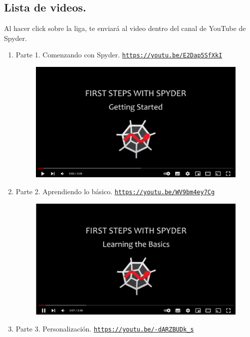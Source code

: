 \subsection{Lista de videos.}

Al hacer click sobre la liga, te enviará al video dentro del canal de YouTube de Spyder.

\begin{enumerate}
\item Parte 1. Comenzando con Spyder. \href{https://youtu.be/E2Dap5SfXkI}{\texttt{https://youtu.be/E2Dap5SfXkI}}
\begin{figure}[H]
    \centering
    \includegraphics[scale=0.4]{Imagenes/Guia_IDE_12.png}
\end{figure}
\item Parte 2. Aprendiendo lo básico. \href{https://youtu.be/WV9bm4ey7Cg}{\texttt{https://youtu.be/WV9bm4ey7Cg}}
\begin{figure}[H]
    \centering
    \includegraphics[scale=0.4]{Imagenes/Guia_IDE_13.png}
\end{figure}
\item Parte 3. Personalización. \href{https://youtu.be/-dARZBUDk_s}{\texttt{https://youtu.be/-dARZBUDk\_s}}

\end{enumerate}
